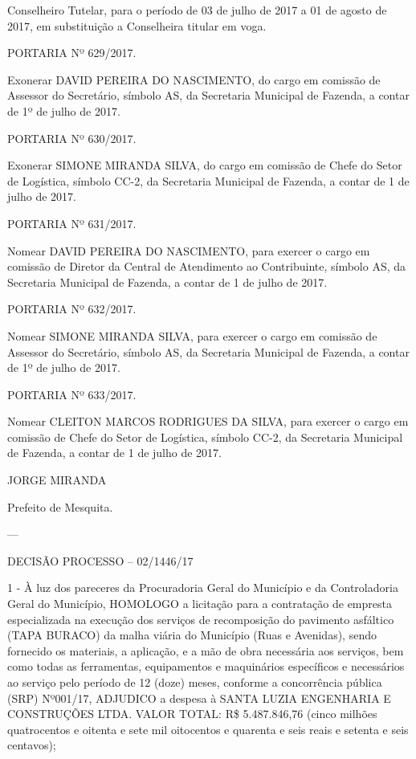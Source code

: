 \documentclass{doliberto}
\begin{document}
Conselheiro Tutelar, para o período de 03 de julho de 2017 
a  01  de  agosto  de  2017,  em  substituição  a  Conselheira 
titular em voga.  
 
PORTARIA Nº 629/2017. 
 
Exonerar DAVID PEREIRA DO NASCIMENTO, do cargo em 
comissão  de  Assessor  do  Secretário,  símbolo  AS,  da 
Secretaria Municipal de Fazenda, a contar de 1º de julho 
de 2017. 
 
PORTARIA Nº 630/2017. 
 
Exonerar SIMONE MIRANDA SILVA, do cargo em comissão 
de  Chefe  do  Setor  de  Logística,  símbolo  CC-2,  da 
Secretaria  Municipal  de  Fazenda,  a  contar  de  1  de  julho 
de 2017. 
 
PORTARIA Nº 631/2017. 
 
Nomear  DAVID  PEREIRA  DO  NASCIMENTO,  para  exercer 
o  cargo  em  comissão  de  Diretor  da  Central  de 
Atendimento ao Contribuinte, símbolo AS, da Secretaria 
Municipal de Fazenda, a contar de 1 de julho de 2017. 
 
PORTARIA Nº 632/2017. 
 
Nomear  SIMONE  MIRANDA  SILVA,  para  exercer  o  cargo 
em  comissão  de  Assessor  do  Secretário,  símbolo  AS,  da 
Secretaria Municipal de Fazenda, a contar de 1º de julho 
de 2017. 
 
PORTARIA Nº 633/2017. 
 
Nomear  CLEITON  MARCOS  RODRIGUES  DA  SILVA,  para 
exercer  o  cargo  em  comissão  de  Chefe  do  Setor  de 
Logística,  símbolo  CC-2,  da  Secretaria  Municipal  de 
Fazenda, a contar de 1 de julho de 2017. 

 

JORGE MIRANDA 

Prefeito de Mesquita. 

---

DECISÃO PROCESSO – 02/1446/17 

 
1 - À luz dos pareceres da Procuradoria Geral do Município 
e  da  Controladoria  Geral  do  Município,  HOMOLOGO  a 
licitação  para  a  contratação  de  empresta  especializada  na 
execução  dos  serviços  de  recomposição  do  pavimento 
asfáltico  (TAPA  BURACO)  da  malha  viária  do  Município 
(Ruas  e  Avenidas),  sendo  fornecido  os  materiais,  a 
aplicação,  e  a  mão  de  obra  necessária  aos  serviços,  bem 
como  todas  as  ferramentas,  equipamentos  e  maquinários 
específicos  e  necessários  ao  serviço  pelo  período  de  12 
(doze)  meses,  conforme  a  concorrência  pública  (SRP) 
Nº001/17,  ADJUDICO  a  despesa  à  SANTA  LUZIA 
ENGENHARIA  E  CONSTRUÇÕES  LTDA.  VALOR  TOTAL:  R\$ 
5.487.846,76  (cinco  milhões  quatrocentos  e  oitenta  e  sete 
mil  oitocentos  e  quarenta  e  seis  reais  e  setenta  e  seis 
centavos); 
 
\end{document}

